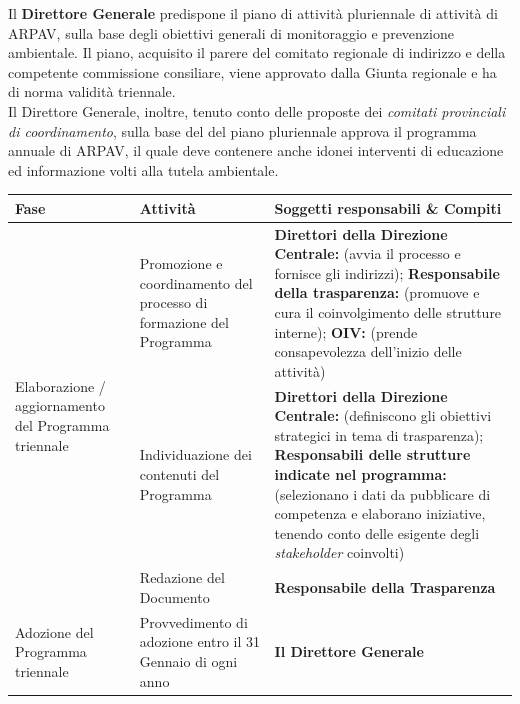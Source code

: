  Il \textbf{Direttore Generale} predispone il piano di attività pluriennale di attività di ARPAV, sulla base degli obiettivi generali di monitoraggio e prevenzione ambientale. Il piano, acquisito il parere del comitato regionale di indirizzo e della competente commissione consiliare, viene approvato dalla Giunta regionale e ha di norma validità triennale. \\
Il Direttore Generale, inoltre, tenuto conto delle proposte dei \textit{comitati provinciali di coordinamento}, sulla base del del piano pluriennale approva il programma annuale di ARPAV, il quale deve contenere anche idonei interventi di educazione ed informazione volti alla tutela ambientale.

\begin{longtable}{p{}|p{}|p{}}
\textbf{Fase} & \textbf{Attività} & \textbf{Soggetti responsabili \& Compiti} \\
\midrule

\endhead



\multirow{3}{0.2\textwidth}{ \vfill Elaborazione / aggiornamento del
Programma triennale} 
	& Promozione e coordinamento del processo di formazione del Programma 
	& \textbf{{\color{Plum}Direttori della Direzione Centrale}:} (avvia il processo e fornisce gli indirizzi);
	\newline
	\textbf{{\color{Plum} Responsabile della trasparenza}:} (promuove e cura il coinvolgimento delle strutture interne);
	\newline
	\textbf{{\color{Plum}OIV\ped{g}}:}
 (prende consapevolezza dell'inizio delle attività) \\ \cline{2-3}
 & Individuazione dei contenuti del Programma 
 & \textbf{{\color{Plum}Direttori della Direzione Centrale}:} (definiscono gli obiettivi strategici in tema di trasparenza); \newline 
   \textbf{{\color{Plum} Responsabili delle strutture indicate nel programma}:} (selezionano i dati da pubblicare di competenza e elaborano iniziative, tenendo conto delle esigente degli \textit{stakeholder }coinvolti)\\ \cline{2-3}
 & Redazione del Documento & \textbf{{\color{Plum}Responsabile della Trasparenza}}\\
\midrule
\vfill Adozione del Programma triennale & Provvedimento di adozione entro il 31 Gennaio di ogni anno & \textbf{{\color{Plum} Il Direttore Generale}} \\
\midrule


\end{longtable}
